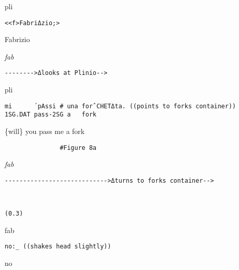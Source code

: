 \documentclass[output=paper,modfonts]{langscibook}
\begin{document}
%
\begin{transbox}{10}{pli}
\begin{verbatim}
<<f>FabriΔzio;>
\end{verbatim}
\hspace{0.525cm} Fabrizio
\end{transbox}\vspace{2mm}
%
\begin{transbox}{11}{\textit{fab}}
\begin{verbatim}
-------->Δlooks at Plinio-->
\end{verbatim}
\end{transbox}\vspace{-0.25mm}
%
\begin{mdframednoverticalspace}[style=firstfoc]
\begin{transbox}{12}{pli}
\begin{verbatim}
mi      ´pAssi # una forˆCHETΔta. ((points to forks container))
1SG.DAT pass-2SG a   fork
\end{verbatim}
\{will\} you pass me a fork
\end{transbox}
\end{mdframednoverticalspace}\vspace{1.75mm}
%
\begin{transbox}{13}{\fig}
\begin{verbatim}
               #Figure 8a
\end{verbatim}
\end{transbox}\vspace{-0.55mm}
%
\begin{mdframednoverticalspace}[style=secondfoc]
\begin{transbox}{14}{\textit{fab}}
\begin{verbatim}
---------------------------->Δturns to forks container-->
\end{verbatim}
\end{transbox}
\end{mdframednoverticalspace}
%
\begin{transbox}{15}{~}
\begin{verbatim}
(0.3)
\end{verbatim}
\end{transbox}
%
\begin{transbox}{16}{fab}
\begin{verbatim}
no:_ ((shakes head slightly))
\end{verbatim}
no
\end{transbox}\vspace{2mm}
\end{document}
